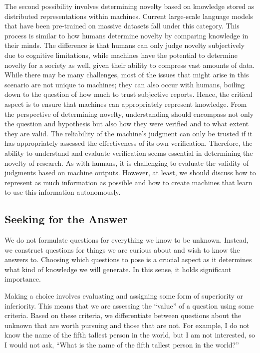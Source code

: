 The second possibility involves determining novelty based on knowledge stored as distributed representations within machines. Current large-scale language models that have been pre-trained on massive datasets fall under this category. This process is similar to how humans determine novelty by comparing knowledge in their minds. The difference is that humans can only judge novelty subjectively due to cognitive limitations, while machines have the potential to determine novelty for a society as well, given their ability to compress vast amounts of data. While there may be many challenges, most of the issues that might arise in this scenario are not unique to machines; they can also occur with humans, boiling down to the question of how much to trust subjective reports. Hence, the critical aspect is to ensure that machines can appropriately represent knowledge. From the perspective of determining novelty, understanding should encompass not only the question and hypothesis but also how they were verified and to what extent they are valid. The reliability of the machine's judgment can only be trusted if it has appropriately assessed the effectiveness of its own verification. Therefore, the ability to understand and evaluate verification seems essential in determining the novelty of research. As with humans, it is challenging to evaluate the validity of judgments based on machine outputs. However, at least, we should discuss how to represent as much information as possible and how to create machines that learn to use this information autonomously.

\subsection{Seeking for the Answer}
We do not formulate questions for everything we know to be unknown. Instead, we construct questions for things we are curious about and wish to know the answers to. Choosing which questions to pose is a crucial aspect as it determines what kind of knowledge we will generate. In this sense, it holds significant importance. 

Making a choice involves evaluating and assigning some form of superiority or inferiority. This means that we are assessing the ``value'' of a question using some criteria. Based on these criteria, we differentiate between questions about the unknown that are worth pursuing and those that are not. For example, I do not know the name of the fifth tallest person in the world, but I am not interested, so I would not ask, ``What is the name of the fifth tallest person in the world?'' 


